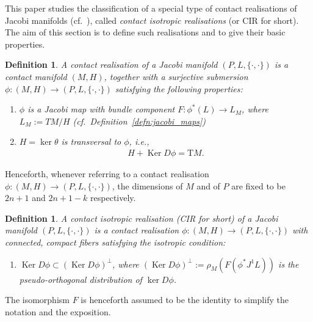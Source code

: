 \documentclass[10pt,a4paper]{amsart}
\numberwithin{equation}{section}
\newtheorem{Definition}[Theorem]{Definition}
\newcommand{\Ker}{\operatorname{Ker}} %
\newcommand{\JM}{(P,L,\{\cdot,\cdot\})} %
\newcommand{\CM}{(M,H)} %
\begin{document}
This paper studies the classif\/ication of a special type of contact realisations of Jacobi manifolds (cf.\ \cite[Def\/inition~3.7]{Zambon}), called {\it contact isotropic realisations} (or CIR for short). The aim of this section is to def\/ine such realisations and to give their basic properties.

\begin{Definition}\label{defn:CR}
A {\it contact realisation} of a Jacobi manifold $\JM$ is a contact manifold $\CM$, together with a surjective submersion $\phi\colon \CM \to \JM$ satisfying the following properties:
 \begin{enumerate}[label=(CR\arabic*),ref=(CR\arabic*),leftmargin=*]\itemsep=0pt
 \item \label{item:IR1}$\phi$ is a Jacobi map with bundle component $F\colon \phi^*(L)\to L_M$, where $L_M:= TM/H$ (cf.\ Def\/inition~\ref{defn:jacobi_maps})
 \item \label{item:IR2} $H = \ker \theta$ is transversal to $\phi$, i.e.,
 \begin{gather*}
 H+\Ker D\phi=\mathrm{T}M.
 \end{gather*}
 \end{enumerate}
\end{Definition}

Henceforth, whenever referring to a contact realisation $\phi\colon \CM \to \JM$, the dimensions of $M$ and of $P$ are f\/ixed to be $2n+1$ and $2n+1-k$ respectively.

\begin{Definition}\label{defn:CIR}
A {\it contact isotropic realisation} (CIR for short) of a Jacobi manifold $\JM$ is a contact realisation $\phi\colon \CM\to \JM$ with connected, compact f\/ibers satisfying the isotropic condition:
 \begin{enumerate}[label=(I),ref=(I)]\itemsep=0pt
 \item \label{item:IR3} $\Ker D\phi\subset (\Ker D\phi)^{\perp}$, where $ (\Ker D\phi)^{\perp} := \rho_M(F(\phi^*J^1L))$ is the {\em pseudo-orthogonal distribution} of $\ker D\phi$.
 \end{enumerate}
\end{Definition}

The isomorphism $F$ is henceforth assumed to be the identity to simplify the notation and the exposition.
\end{document}
